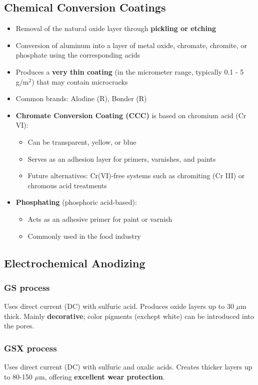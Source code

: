 \documentclass{article}
\begin{document}
\subsection{Chemical Conversion Coatings}
\begin{itemize}
  \item Removal of the natural oxide layer through \textbf{pickling or etching}
  \item Conversion of aluminum into a layer of metal oxide, chromate, chromite, or phosphate using the corresponding acids
  \item Produces a \textbf{very thin coating} (in the micrometer range, typically 0.1 - 5 g/m$^2$) that may contain microcracks
  \item Common brands: Alodine (R), Bonder (R)
  \item \textbf{Chromate Conversion Coating (CCC)} is based on chromium acid (Cr VI):
  \begin{itemize}
    \item Can be transparent, yellow, or blue
    \item Serves as an adhesion layer for primers, varnishes, and paints
    \item Future alternatives: Cr(VI)-free systems such as chromiting (Cr III) or chromous acid treatments
  \end{itemize}
  \item \textbf{Phosphating} (phosphoric acid-based):
  \begin{itemize}
    \item Acts as an adhesive primer for paint or varnish
    \item Commonly used in the food industry
  \end{itemize}
\end{itemize}

\subsection{Electrochemical Anodizing}
\subsubsection{GS process}
Uses direct current (DC) with sulfuric acid. Produces oxide layers up to 30 $\mu$m thick.
Mainly \textbf{decorative}; color pigments (exchept white) can be introduced into the pores.

\subsubsection{GSX process}
Uses direct current (DC) with sulfuric and oxalic acids. Creates thicker layers up to 80-150 $\mu$m,
offering \textbf{excellent wear protection}.
\end{document}

